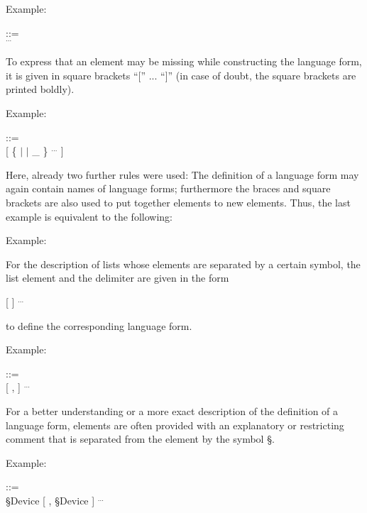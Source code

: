 Example:

 ::=\\
\x {} $^{...}$

To express that an element may be missing while constructing the
language form, it is given in square brackets ``['' ... ``]'' (in case
of doubt, the square brackets are printed boldly).

Example:

 ::=\\
\x {} [ \{  $\mid$  $\mid$ \_ \} $^{...}$ ]

Here, already two further rules were used: The definition of a language
form may again contain names of language forms; furthermore the braces
and square brackets are also used to put together elements to new
elements. Thus, the last example is equivalent to the following:

Example:

\begin{grammarframe}

\end{grammarframe}


For the description of lists whose elements are separated by a certain
symbol, the list element and the delimiter are given in the form

 [   ] $^{...}$

to define the corresponding language form.

Example:

 ::=\\
\x {} [ ,  ] $^{...}$

For a better understanding or a more exact description of the definition
of a language form, elements are often provided with an explanatory or
restricting comment that is separated from the element by the symbol
\S .

Example:

 ::=\\
\x {}\S  Device [ , \S Device ] $^{...}$

